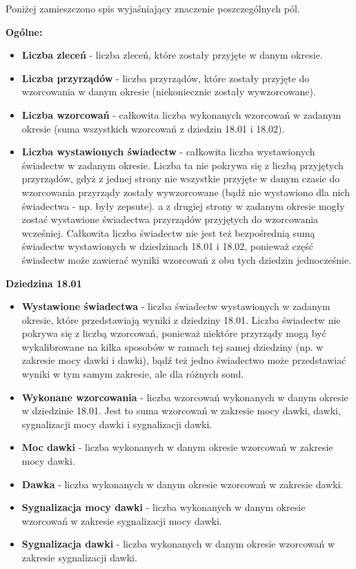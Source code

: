 Poniżej zamieszczono spis wyjaśniający znaczenie poszczególnych pól.

\textbf{Ogólne:}
\begin{itemize} 
	\item \textbf{Liczba zleceń} - liczba zleceń, które zostały przyjęte w danym okresie.
	\item \textbf{Liczba przyrządów} - liczba przyrządów, które zostały przyjęte do wzorcowania w danym okresie (niekoniecznie zostały wywzorcowane).
	\item \textbf{Liczba wzorcowań} - całkowita liczba wykonanych wzorcowań w zadanym okresie (suma wszystkich wzorcowań z dziedzin 18.01 i 18.02).
	\item \textbf{Liczba wystawionych świadectw} - całkowita liczba wystawionych świadectw w zadanym okresie. Liczba ta nie pokrywa się z liczbą przyjętych przyrządów, gdyż z jednej strony nie wszystkie przyjęte w danym czasie do wzorcowania przyrządy zostały wywzorcowane (bądź nie wystawiono dla nich świadectwa - np. były zepsute). a z drugiej strony w zadanym okresie mogły zostać wystawione świadectwa przyrządów przyjętych do wzorcowania wcześniej. Całkowita liczba świadectw nie jest też bezpośrednią sumą świadectw wystawionych w dziedzinach 18.01 i 18.02, ponieważ część świadectw może zawierać wyniki wzorcowań z obu tych dziedzin jednocześnie.
\end{itemize}

\textbf{Dziedzina 18.01}
\begin{itemize}
	\item \textbf{Wystawione świadectwa} - liczba świadectw wystawionych w zadanym okresie, które przedstawiają wyniki z dziedziny 18.01. Liczba świadectw nie pokrywa się z liczbą wzorcowań, ponieważ niektóre przyrządy mogą być wykalibrowane na kilka sposobów w ramach tej samej dziedziny (np. w zakresie mocy dawki i dawki), bądź też jedno świadectwo może przedstawiać wyniki w tym samym zakresie, ale dla różnych sond.
	\item \textbf{Wykonane wzorcowania} - liczba wzorcowań wykonanych w danym okresie w dziedzinie 18.01. Jest to suma wzorcowań w zakresie mocy dawki, dawki, sygnalizacji mocy dawki i sygnalizacji dawki.
	\item \textbf{Moc dawki} - liczba wykonanych w danym okresie wzorcowań w zakresie mocy dawki.
	\item \textbf{Dawka} - liczba wykonanych w danym okresie wzorcowań w zakresie dawki.
	\item \textbf{Sygnalizacja mocy dawki} - liczba wykonanych w danym okresie wzorcowań w zakresie sygnalizacji mocy dawki.
	\item \textbf{Sygnalizacja dawki} - liczba wykonanych w danym okresie wzorcowań w zakresie sygnalizacji dawki.
\end{itemize}


